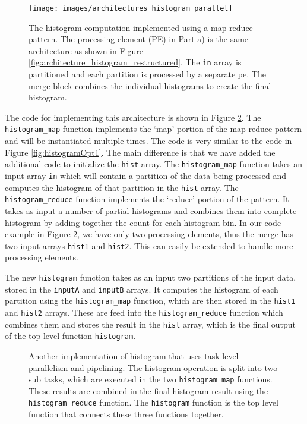 \begin{figure}
\centering
\texttt{[image: images/architectures\_histogram\_parallel]}
\caption{The histogram computation implemented using a map-reduce pattern.  The processing element (PE) in Part a) is the same architecture as shown in Figure \ref{fig:architecture_histogram_restructured}. The \lstinline|in| array is partitioned and each partition is processed by a separate \gls{pe}. The merge block combines the individual histograms to create the final histogram.  }
\label{fig:architecture_histogram_parallel}
\end{figure}

The code for implementing this architecture is shown in Figure \ref{fig:histogram_parallel}. The \lstinline{histogram_map} function implements the `map' portion of the map-reduce pattern and will be instantiated multiple times. The code is very similar to the code in Figure \ref{fig:histogramOpt1}. The main difference is that we have added the additional code to initialize the \lstinline|hist| array.  The \lstinline{histogram_map} function takes an input array \lstinline{in} which will contain a partition of the data being processed and computes the histogram of that partition in the \lstinline|hist| array.   The \lstinline{histogram_reduce} function implements the `reduce' portion of the pattern.  It takes as input a number of partial histograms and combines them into complete histogram by adding together the count for each histogram bin.  In our code example in Figure \ref{fig:histogram_parallel}, we have only two processing elements, thus the merge has two input arrays \lstinline{hist1} and \lstinline{hist2}. This can easily be extended to handle more processing elements.

The new \lstinline{histogram} function takes as an input two partitions of the input data, stored in the \lstinline{inputA} and \lstinline{inputB} arrays.  It computes the histogram of each partition using the \lstinline {histogram_map} function, which are then stored in the \lstinline{hist1} and \lstinline{hist2} arrays. These are feed into the \lstinline{histogram_reduce} function which combines them and stores the result in the \lstinline{hist} array, which is the final output of the top level function \lstinline{histogram}. 

\begin{figure}
{\tiny }
\caption{ Another implementation of histogram that uses task level parallelism and pipelining. The histogram operation is split into two sub tasks, which are executed in the two \lstinline{histogram_map} functions. These results are combined in the final histogram result using the \lstinline{histogram_reduce} function. The \lstinline{histogram} function is the top level function that connects these three functions together. }
\label{fig:histogram_parallel}
\end{figure}

